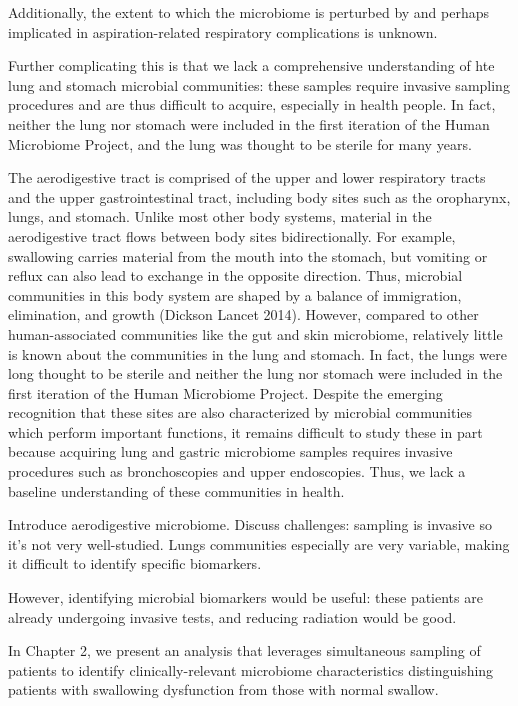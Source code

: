 Additionally, the extent to which the microbiome is perturbed by and perhaps implicated in aspiration-related respiratory complications is unknown.

Further complicating this is that we lack a comprehensive understanding of hte lung and stomach microbial communities: these samples require invasive sampling procedures and are thus difficult to acquire, especially in health people.
In fact, neither the lung nor stomach were included in the first iteration of the Human Microbiome Project, and the lung was thought to be sterile for many years.

The aerodigestive tract is comprised of the upper and lower respiratory tracts and the upper gastrointestinal tract, including body sites such as the oropharynx, lungs, and stomach.
Unlike most other body systems, material in the aerodigestive tract flows between body sites bidirectionally.
For example, swallowing carries material from the mouth into the stomach, but vomiting or reflux can also lead to exchange in the opposite direction.
Thus, microbial communities in this body system are shaped by a balance of immigration, elimination, and growth (Dickson Lancet 2014).
However, compared to other human-associated communities like the gut and skin microbiome, relatively little is known about the communities in the lung and stomach.
In fact, the lungs were long thought to be sterile and neither the lung nor stomach were included in the first iteration of the Human Microbiome Project.
Despite the emerging recognition that these sites are also characterized by microbial communities which perform important functions, it remains difficult to study these in part because acquiring lung and gastric microbiome samples requires invasive procedures such as bronchoscopies and upper endoscopies.
Thus, we lack a baseline understanding of these communities in health.

Introduce aerodigestive microbiome. Discuss challenges: sampling is invasive so it's not very well-studied. Lungs communities especially are very variable, making it difficult to identify specific biomarkers.

However, identifying microbial biomarkers would be useful: these patients are already undergoing invasive tests, and reducing radiation would be good.

In Chapter 2, we present an analysis that leverages simultaneous sampling of patients to identify clinically-relevant microbiome characteristics distinguishing patients with swallowing dysfunction from those with normal swallow.

